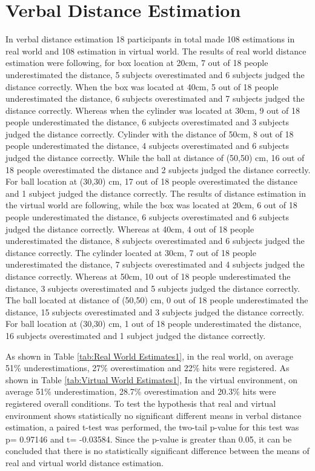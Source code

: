 \section{Verbal Distance Estimation}
In verbal distance estimation 18 participants in total made 108 estimations in real world and 108 estimation in virtual world. The results of real world distance estimation were following, for box location at 20cm, 7 out of 18 people underestimated the distance, 5 subjects overestimated and 6 subjects judged the distance correctly. When the box was located at 40cm, 5 out of 18 people underestimated the distance, 6 subjects overestimated and 7 subjects judged the distance correctly. Whereas when the cylinder was located at 30cm, 9 out of 18 people underestimated the distance, 6 subjects overestimated and 3 subjects judged the distance correctly. Cylinder with the distance of 50cm, 8 out of 18 people underestimated the distance, 4 subjects overestimated and 6 subjects judged the distance correctly. While the ball at distance of (50,50) cm, 16 out of 18 people overestimated the distance and 2 subjects judged the distance correctly. For ball location at (30,30) cm, 17 out of 18 people overestimated the distance and 1 subject judged the distance correctly. The results of distance estimation in the virtual world are following, while the box was located at 20cm, 6 out of 18 people underestimated the distance, 6 subjects overestimated and 6 subjects judged the distance correctly. Whereas at 40cm, 4 out of 18 people underestimated the distance, 8 subjects overestimated and 6 subjects judged the distance correctly. The cylinder located at 30cm, 7 out of 18 people underestimated the distance, 7 subjects overestimated and 4 subjects judged the distance correctly. Whereas at 50cm, 10 out of 18 people underestimated the distance, 3 subjects overestimated and 5 subjects judged the distance correctly. The ball located at distance of (50,50) cm, 0 out of 18 people underestimated the distance, 15 subjects overestimated and 3 subjects judged the distance correctly. For ball location at (30,30) cm, 1 out of 18 people underestimated the distance, 16 subjects overestimated and 1 subject judged the distance correctly.

As shown in Table \ref{tab:Real World Estimates1}, in the real world, on average 51\% underestimations,
27\% overestimation and 22\% hits were registered. As shown in Table \ref{tab:Virtual World Estimates1}, In the virtual environment, on average 51\% underestimation, 28.7\% overestimation and 20.3\% hits were registered overall conditions. To test the hypothesis that real and virtual environment shows statistically no significant different means in verbal distance estimation, a paired t-test was performed, the two-tail p-value for this test was p= 0.97146 and t= -0.03584. Since the p-value is greater than 0.05, it can be concluded that there is no statistically significant difference between the means of real and virtual world distance estimation.\par


